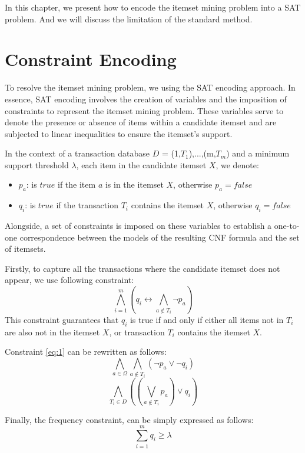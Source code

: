 In this chapter, we present how to encode the itemset mining problem into a SAT problem. And we will discuss the limitation of the standard method.
\section{Constraint Encoding}
To resolve the itemset mining problem, we using the SAT encoding approach.
In essence, SAT encoding involves the creation of variables and the imposition of constraints to represent the itemset mining problem.
These variables serve to denote the presence or absence of items within a candidate itemset and are subjected to linear inequalities to ensure the itemset's support.

In the context of a transaction database $D$ = {(1,$T_1$),...,(m,$T_m$)} and a minimum support threshold $\lambda$,
each item in the candidate itemset $X$, we denote:
\begin{itemize}
    \item $p_a$: is $true$ if the item $a$ is in the itemset $X$, otherwise $p_a = false$
    \item $q_i$: is $true$ if the transaction $T_i$ contains the itemset $X$, otherwise $q_i = false$
\end{itemize}
Alongside, a set of constraints is imposed on these variables to establish a one-to-one correspondence between the models of the resulting CNF formula and the set of itemsets.

Firstly, to capture all the transactions where the candidate itemset does not appear, we use following constraint:
\begin{equation}
    \label{eq:1}
    \bigwedge_{i=1}^{m} (q_i \leftrightarrow \bigwedge_{a \notin T_i} \neg p_a)
\end{equation}
This constraint guarantees that $q_i$ is true if and only if either all items not in $T_i$ are also not in the itemset $X$, or transaction $T_i$ contains the itemset $X$.

Constraint \ref{eq:1} can be rewritten as follows:
\begin{equation}
    \label{eq:2}
    \bigwedge_{a \in \Omega} \bigwedge_{a \notin T_i} (\neg p_a \vee \neg q_i)
\end{equation}
\begin{equation}
    \label{eq:3}
    \bigwedge_{T_i \in D} ((\bigvee_{a \notin T_i} p_a) \vee q_i)
\end{equation}


Finally, the frequency constraint, can be simply expressed as follows:
\begin{equation}
    \label{eq:4}
    \sum_{i=1}^{m} q_i \geq \lambda
\end{equation}

